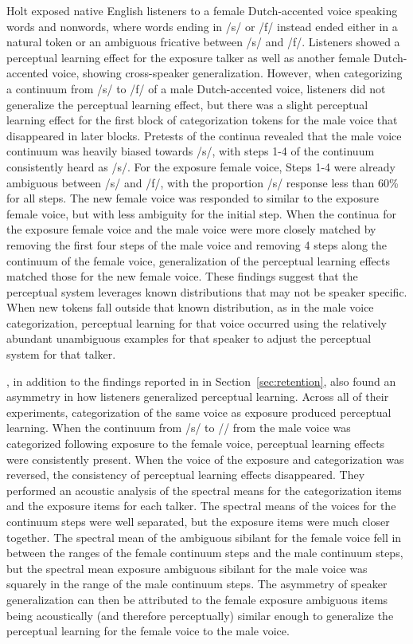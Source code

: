 \documentclass[11pt]{article} %
\begin{document}
\citet{Reinisch2013a} Holt exposed native English listeners to a female Dutch-accented voice speaking words and nonwords, where words ending in /s/ or /f/ instead ended either in a natural token or an ambiguous fricative between /s/ and /f/.  
Listeners showed a perceptual learning effect for the exposure talker as well as another female Dutch-accented voice, showing cross-speaker generalization.  
However, when categorizing a continuum from /s/ to /f/ of a male Dutch-accented voice, listeners did not generalize the perceptual learning effect, but there was a slight perceptual learning effect for the first block of categorization tokens for the male voice that disappeared in later blocks.  
Pretests of the continua revealed that the male voice continuum was heavily biased towards /s/, with steps 1-4 of the continuum consistently heard as /s/. 
 For the exposure female voice, Steps 1-4 were already ambiguous between /s/ and /f/, with the proportion /s/ response less than 60\% for all steps.  
The new female voice was responded to similar to the exposure female voice, but with less ambiguity for the initial step.  
When the continua for the exposure female voice and the male voice were more closely matched by removing the first four steps of the male voice and removing 4 steps along the continuum of the female voice, generalization of the perceptual learning effects matched those for the new female voice.  
These findings suggest that the perceptual system leverages known distributions that may not be speaker specific.  
When new tokens fall outside that known distribution, as in the male voice categorization, perceptual learning for that voice occurred using the relatively abundant unambiguous examples for that speaker to adjust the perceptual system for that talker.

\citet{Kraljic2005}, in addition to the findings reported in in Section~\ref{sec:retention}, also found an asymmetry in how listeners generalized perceptual learning.  
Across all of their experiments, categorization of the same voice as exposure produced perceptual learning.  
When the continuum from /s/ to /\textesh/ from the male voice was categorized following exposure to the female voice, perceptual learning effects were consistently present.
When the voice of the exposure and categorization was reversed, the consistency of perceptual learning effects disappeared. 
They performed an acoustic analysis of the spectral means for the categorization items and the exposure items for each talker.  The spectral means of the voices for the continuum steps were well separated, but the exposure items were much closer together.  The spectral mean of the ambiguous sibilant for the female voice fell in between the ranges of the female continuum steps and the male continuum steps, but the spectral mean exposure ambiguous sibilant for the male voice was squarely in the range of the male continuum steps.  The asymmetry of speaker generalization can then be attributed to the female exposure ambiguous items being acoustically (and therefore perceptually) similar enough to generalize the perceptual learning for the female voice to the male voice.
\end{document}
